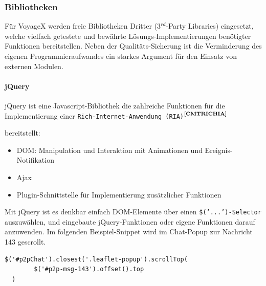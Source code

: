 
\subsubsection{Bibliotheken}
Für VoyageX werden freie Bibliotheken Dritter (3$^{rd}$-Party Libraries) eingesetzt, welche vielfach getestete und bewährte Lösungs-Implementierungen benötigter Funktionen bereitstellen. Neben der Qualitäts-Sicherung ist die Verminderung des eigenen Programmieraufwandes ein starkes Argument für den Einsatz von externen
Modulen.

\paragraph{jQuery}
jQuery ist eine Javascript-Bibliothek die zahlreiche Funktionen für die Implementierung einer \texttt{Rich-Internet-Anwendung (RIA)}$^{\textbf{\ref{CMTRICHIA}}}$%
\addtocounter{footnote}{1}%
 bereitstellt:
	\begin{itemize}
		\item DOM: Manipulation und Interaktion mit Animationen und Ereignis-Notifikation
		\item Ajax
		\item Plugin-Schnittstelle für Implementierung zusätzlicher Funktionen
	\end{itemize}
Mit jQuery ist es denkbar einfach DOM-Elemente über einen \texttt{\$('...')-Selector} auszuwählen, und eingebaute jQuery-Funktionen oder eigene Funktionen darauf anzuwenden. Im folgenden Beispiel-Snippet wird im Chat-Popup zur Nachricht 143 gescrollt.
\lstset{language=JavaScript}
\begin{lstlisting}[frame=single,xleftmargin=0pt,numbers=none]
$('#p2pChat').closest('.leaflet-popup').scrollTop(
		$('#p2p-msg-143').offset().top
  )
\end{lstlisting}

